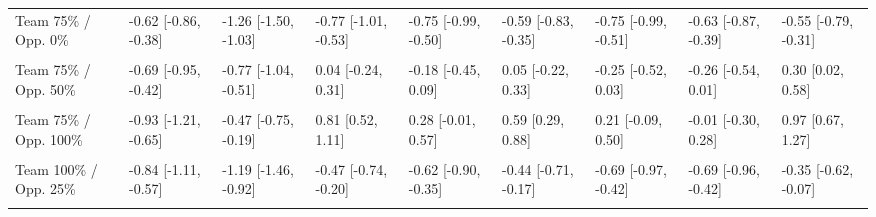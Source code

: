 \documentclass[]{elsarticle} %
\begin{document}
\begin{landscape}
\begin{table}
{\begin{tabular}[t]{lllllllll}
\addlinespace
Team 75\% / Opp. 0\% & -0.62 [-0.86, -0.38] & -1.26 [-1.50, -1.03] & -0.77 [-1.01, -0.53] & -0.75 [-0.99, -0.50] & -0.59 [-0.83, -0.35] & -0.75 [-0.99, -0.51] & -0.63 [-0.87, -0.39] & -0.55 [-0.79, -0.31]\\
\cellcolor{gray!6}{Team 75\% / Opp. 25\%} & \cellcolor{gray!6}{-0.66 [-0.92, -0.41]} & \cellcolor{gray!6}{-1.04 [-1.29, -0.79]} & \cellcolor{gray!6}{-0.34 [-0.60, -0.09]} & \cellcolor{gray!6}{-0.46 [-0.72, -0.21]} & \cellcolor{gray!6}{-0.27 [-0.52, -0.01]} & \cellcolor{gray!6}{-0.49 [-0.75, -0.23]} & \cellcolor{gray!6}{-0.46 [-0.71, -0.20]} & \cellcolor{gray!6}{-0.13 [-0.39, 0.13]}\\
Team 75\% / Opp. 50\% & -0.69 [-0.95, -0.42] & -0.77 [-1.04, -0.51] & 0.04 [-0.24, 0.31] & -0.18 [-0.45, 0.09] & 0.05 [-0.22, 0.33] & -0.25 [-0.52, 0.03] & -0.26 [-0.54, 0.01] & 0.30 [0.02, 0.58]\\
\cellcolor{gray!6}{Team 75\% / Opp. 75\%} & \cellcolor{gray!6}{-0.80 [-1.07, -0.53]} & \cellcolor{gray!6}{-0.63 [-0.90, -0.35]} & \cellcolor{gray!6}{0.43 [0.15, 0.72]} & \cellcolor{gray!6}{0.03 [-0.25, 0.31]} & \cellcolor{gray!6}{0.32 [0.04, 0.60]} & \cellcolor{gray!6}{0.01 [-0.27, 0.29]} & \cellcolor{gray!6}{-0.07 [-0.35, 0.21]} & \cellcolor{gray!6}{0.70 [0.41, 0.99]}\\
Team 75\% / Opp. 100\% & -0.93 [-1.21, -0.65] & -0.47 [-0.75, -0.19] & 0.81 [0.52, 1.11] & 0.28 [-0.01, 0.57] & 0.59 [0.29, 0.88] & 0.21 [-0.09, 0.50] & -0.01 [-0.30, 0.28] & 0.97 [0.67, 1.27]\\
\addlinespace
\cellcolor{gray!6}{Team 100\% / Opp. 0\%} & \cellcolor{gray!6}{-0.80 [-1.06, -0.53]} & \cellcolor{gray!6}{-1.41 [-1.67, -1.16]} & \cellcolor{gray!6}{-0.90 [-1.15, -0.64]} & \cellcolor{gray!6}{-0.91 [-1.16, -0.65]} & \cellcolor{gray!6}{-0.77 [-1.03, -0.51]} & \cellcolor{gray!6}{-0.96 [-1.21, -0.70]} & \cellcolor{gray!6}{-0.87 [-1.12, -0.61]} & \cellcolor{gray!6}{-0.77 [-1.02, -0.51]}\\
Team 100\% / Opp. 25\% & -0.84 [-1.11, -0.57] & -1.19 [-1.46, -0.92] & -0.47 [-0.74, -0.20] & -0.62 [-0.90, -0.35] & -0.44 [-0.71, -0.17] & -0.69 [-0.97, -0.42] & -0.69 [-0.96, -0.42] & -0.35 [-0.62, -0.07]\\
\cellcolor{gray!6}{Team 100\% / Opp. 50\%} & \cellcolor{gray!6}{-0.86 [-1.14, -0.58]} & \cellcolor{gray!6}{-0.92 [-1.20, -0.64]} & \cellcolor{gray!6}{-0.09 [-0.38, 0.20]} & \cellcolor{gray!6}{-0.34 [-0.63, -0.05]} & \cellcolor{gray!6}{-0.12 [-0.41, 0.17]} & \cellcolor{gray!6}{-0.45 [-0.74, -0.16]} & \cellcolor{gray!6}{-0.50 [-0.78, -0.21]} & \cellcolor{gray!6}{0.08 [-0.21, 0.38]}\\

\end{tabular}}
\end{table}
\end{landscape}
\end{document}
